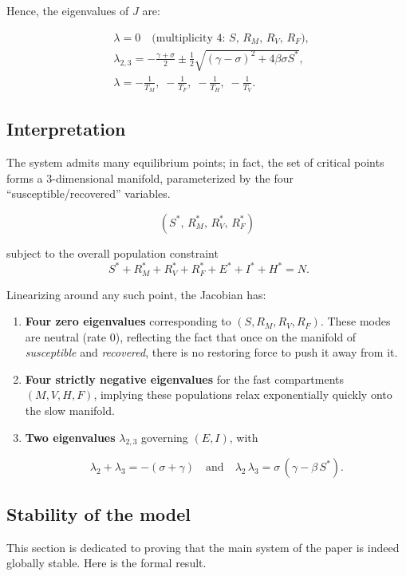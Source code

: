 \documentclass[11pt]{article}
\begin{document}
Hence, the eigenvalues of $J$ are:

\[
\boxed{
\begin{aligned}
&\lambda = 0 \quad \text{(multiplicity 4: } S,\, R_M,\, R_V,\, R_F),\\
&\lambda_{2,3} = -\frac{\gamma + \sigma}{2} \pm \frac{1}{2} \sqrt{(\gamma - \sigma)^2 + 4 \beta \sigma S^*},\\
&\lambda = -\frac{1}{T_M},\; -\frac{1}{T_F},\; -\frac{1}{T_H},\; -\frac{1}{T_V}.
\end{aligned}
}
\]


\subsection{Interpretation}


The system admits many equilibrium points; in fact, the set of critical points forms a 3-dimensional manifold, parameterized by the four “susceptible/recovered” variables.

$$(S^*,\,R_M^*,\,R_V^*,\,R_F^*)$$

subject to the overall population constraint
$$\;S^* + R_M^* + R_V^* + R_F^* + E^* + I^* + H^* = N.$$

Linearizing around any such point, the Jacobian has:

\begin{enumerate}
    \item \textbf{Four zero eigenvalues} corresponding to $(S,R_M,R_V,R_F)$. These modes are neutral (rate 0), reflecting the fact that once on the manifold of \emph{susceptible} and \emph{recovered}, there is no restoring force to push it away from it.
    \item \textbf{Four strictly negative eigenvalues} for the fast compartments $(M,V,H,F)$, implying these populations relax exponentially quickly onto the slow manifold.
    \item \textbf{Two eigenvalues} $\lambda_{2,3}$ governing $(E,I)$, with

 $$\lambda_2 + \lambda_3 = -(\sigma + \gamma)\quad\text{and}\quad\lambda_2\,\lambda_3 = \sigma\,(\gamma - \beta\,S^*). $$
\end{enumerate}

\subsection{Stability of the model}

This section is dedicated to proving that the main system of the paper is indeed globally stable.  Here is the formal result.  
\end{document}

